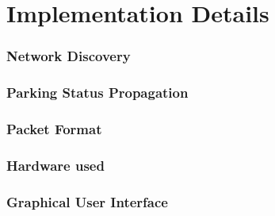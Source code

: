 \chapter{Implementation Details}

\subsection{Network Discovery}

\subsection{Parking Status Propagation}

\subsection{Packet Format}

\subsection{Hardware used}

\subsection{Graphical User Interface}


